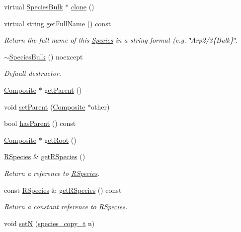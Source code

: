\begin{DoxyCompactItemize}
virtual \hyperlink{classSpeciesBulk}{Species\+Bulk} $\ast$ \hyperlink{classSpeciesBulk_a4bca7120d95d6303f66a5bca30a2612b}{clone} ()
\item 
virtual string \hyperlink{classSpeciesBulk_aeb3983d890dae341fe53355c4b29dc6b}{get\+Full\+Name} () const 
\begin{DoxyCompactList}\small\item\em Return the full name of this \hyperlink{classSpecies}{Species} in a string format (e.\+g. \char`\"{}\+Arp2/3\{\+Bulk\}\char`\"{}. \end{DoxyCompactList}\item 
\hyperlink{classSpeciesBulk_a38a4f887db51ac60a6875024681d1988}{$\sim$\+Species\+Bulk} () noexcept
\begin{DoxyCompactList}\small\item\em Default destructor. \end{DoxyCompactList}\item 
\hyperlink{classComposite}{Composite} $\ast$ \hyperlink{classSpecies_af24cab7cbaa561d35b08fef5faf05fdf}{get\+Parent} ()
\item 
void \hyperlink{classSpecies_acc64c5b61abf911872d433ac32b62de8}{set\+Parent} (\hyperlink{classComposite}{Composite} $\ast$other)
\item 
bool \hyperlink{classSpecies_a40262d7217fcc28a31682aee40a19232}{has\+Parent} () const 
\item 
\hyperlink{classComposite}{Composite} $\ast$ \hyperlink{classSpecies_a876c8a827476a11e05f3b7a7669c29b6}{get\+Root} ()
\item 
\hyperlink{classRSpecies}{R\+Species} \& \hyperlink{classSpecies_a048dd7bc3fecd08b1b1797dc83aa163d}{get\+R\+Species} ()
\begin{DoxyCompactList}\small\item\em Return a reference to \hyperlink{classRSpecies}{R\+Species}. \end{DoxyCompactList}\item 
const \hyperlink{classRSpecies}{R\+Species} \& \hyperlink{classSpecies_aa1069a34b360f84d186f48bd99f80971}{get\+R\+Species} () const 
\begin{DoxyCompactList}\small\item\em Return a constant reference to \hyperlink{classRSpecies}{R\+Species}. \end{DoxyCompactList}\item 
void \hyperlink{classSpecies_a88de7cf5130cb9cee2da3585374db654}{set\+N} (\hyperlink{common_8h_a3503f321fd36304ee274141275cca586}{species\+\_\+copy\+\_\+t} n)

\end{DoxyCompactItemize}
